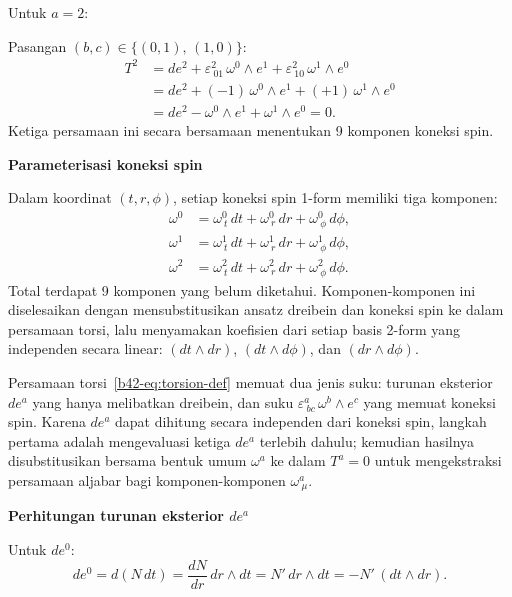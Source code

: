\noindent Untuk $a = 2$:
 
Pasangan $(b,c) \in \{(0,1),\,(1,0)\}$:
\begin{align}
    T^2 &= de^2 + \varepsilon^{2}_{\ 01}\,\omega^0 \wedge e^1 + \varepsilon^{2}_{\ 10}\,\omega^1 \wedge e^0 \nonumber\\[4pt]
    &= de^2 + (-1)\,\omega^0 \wedge e^1 + (+1)\,\omega^1 \wedge e^0 \nonumber\\[4pt]
    &= de^2 - \omega^0 \wedge e^1 + \omega^1 \wedge e^0 = 0. \label{b42-eq:T2}
\end{align}
Ketiga persamaan ini secara bersamaan menentukan 9 komponen koneksi spin.
 
\vspace{0.5em}
\noindent \textbf{Parameterisasi koneksi spin}

Dalam koordinat $(t, r, \phi)$, setiap koneksi spin 1-form memiliki tiga komponen:
\begin{align}
    \omega^0 &= \omega^0_{\ t}\,dt + \omega^0_{\ r}\,dr + \omega^0_{\ \phi}\,d\phi, \\
    \omega^1 &= \omega^1_{\ t}\,dt + \omega^1_{\ r}\,dr + \omega^1_{\ \phi}\,d\phi, \\
    \omega^2 &= \omega^2_{\ t}\,dt + \omega^2_{\ r}\,dr + \omega^2_{\ \phi}\,d\phi.
\end{align}
Total terdapat 9 komponen yang belum diketahui. Komponen-komponen ini diselesaikan dengan mensubstitusikan ansatz dreibein dan koneksi spin ke dalam persamaan torsi, lalu menyamakan koefisien dari setiap basis 2-form yang independen secara linear: $(dt \wedge dr)$, $(dt \wedge d\phi)$, dan $(dr \wedge d\phi)$.
 
Persamaan torsi~\eqref{b42-eq:torsion-def} memuat dua jenis suku: turunan eksterior $de^a$ yang hanya melibatkan dreibein, dan suku $\varepsilon^a_{\ bc}\,\omega^b \wedge e^c$ yang memuat koneksi spin. Karena $de^a$ dapat dihitung secara independen dari koneksi spin, langkah pertama adalah mengevaluasi ketiga $de^a$ terlebih dahulu; kemudian hasilnya disubstitusikan bersama bentuk umum $\omega^a$ ke dalam $T^a = 0$ untuk mengekstraksi persamaan aljabar bagi komponen-komponen $\omega^a_{\ \mu}$.
 
\vspace{0.5em}
\noindent \textbf{Perhitungan turunan eksterior $de^a$}

Untuk $de^0$:
\begin{equation}
    de^0 = d\!\left(N\,dt\right) = \frac{dN}{dr}\,dr \wedge dt = N'\,dr \wedge dt = -N'\,(dt \wedge dr). \label{b42-eq:de0}
\end{equation}
 
